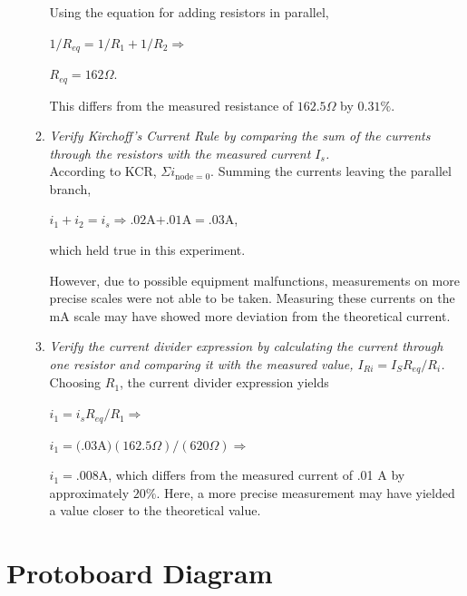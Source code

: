 \documentclass[twocolumn,english]{IEEEtran}
\theoremstyle{plain}
\theoremstyle{plain}
\begin{document}
\begin{enumerate}
\begin{enumerate}
                   Using the equation for adding resistors in parallel,

                   $1/R_{eq} = 1/R_1 + 1/R_2 \Rightarrow$

                   $R_{eq} = 162 \Omega$.

                   This differs from the measured resistance of $162.5 \Omega$ by $0.31\%$. \\

                   \item \textit{Verify Kirchoff's Current Rule by comparing the sum of the currents through the resistors with the measured current $I_s$.}\\

                   According to KCR, $\Sigma i_{\text{node} = 0}$. Summing the currents leaving the parallel branch,

                   $i_1 + i_2 = i_s \Rightarrow .02$A$+.01$A$ = .03$A,

                   which held true in this experiment.

                   However, due to possible equipment malfunctions, measurements on more precise scales were not able to be taken. Measuring these currents on the mA scale may have showed more deviation from the theoretical current.\\

                   \item \textit{Verify the current divider expression by calculating the current through one resistor and comparing it with the measured value, $I_{Ri} = I_S R_{eq} / R_i$.}\\

                   Choosing $R_1$, the current divider expression yields

                   $i_1 = i_s R_{eq} / R_1 \Rightarrow$

                   $i_1 = (.03$A$)(162.5 \Omega) / (620 \Omega) \Rightarrow$

                   $i_1 = .008$A, which differs from the measured current of .01 A by approximately $20\%$. Here, a more precise measurement may have yielded a value closer to the theoretical value.
                  \end{enumerate}


\end{enumerate}

\appendices{}

\section{Protoboard Diagram}\label{append:deriv}
\end{document}
